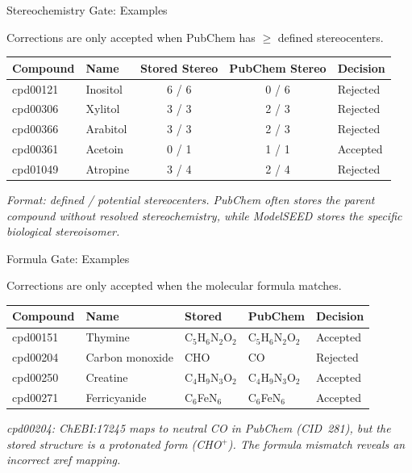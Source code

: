 \documentclass[aspectratio=169,11pt]{beamer}
\begin{document}
\begin{frame}{Stereochemistry Gate: Examples}

Corrections are only accepted when PubChem has $\geq$ defined stereocenters.

\bigskip
\begin{table}[h]
\centering
\footnotesize
\begin{tabular}{llccl}
\toprule
\textbf{Compound} & \textbf{Name}
  & \textbf{Stored Stereo} & \textbf{PubChem Stereo} & \textbf{Decision} \\
\midrule
cpd00121 & Inositol   & 6 / 6 & 0 / 6 & \textcolor{rejectred}{Rejected} \\
cpd00306 & Xylitol    & 3 / 3 & 2 / 3 & \textcolor{rejectred}{Rejected} \\
cpd00366 & Arabitol   & 3 / 3 & 2 / 3 & \textcolor{rejectred}{Rejected} \\
cpd00361 & Acetoin    & 0 / 1 & 1 / 1 & \textcolor{acceptgreen}{Accepted} \\
cpd01049 & Atropine   & 3 / 4 & 2 / 4 & \textcolor{rejectred}{Rejected} \\
\bottomrule
\end{tabular}
\end{table}

\bigskip
\footnotesize
\textit{Format: defined / potential stereocenters.
PubChem often stores the parent compound without resolved stereochemistry,
while ModelSEED stores the specific biological stereoisomer.}

\end{frame}

\begin{frame}[fragile]{Formula Gate: Examples}

Corrections are only accepted when the molecular formula matches.

\bigskip
\begin{table}[h]
\centering
\footnotesize
\begin{tabular}{lp{2cm}lll}
\toprule
\textbf{Compound} & \textbf{Name}
  & \textbf{Stored} & \textbf{PubChem} & \textbf{Decision} \\
\midrule
cpd00151 & Thymine
  & C$_5$H$_6$N$_2$O$_2$ & C$_5$H$_6$N$_2$O$_2$ & \textcolor{acceptgreen}{Accepted} \\
cpd00204 & Carbon monoxide
  & CHO & CO & \textcolor{rejectred}{Rejected} \\
cpd00250 & Creatine
  & C$_4$H$_9$N$_3$O$_2$ & C$_4$H$_9$N$_3$O$_2$ & \textcolor{acceptgreen}{Accepted} \\
cpd00271 & Ferricyanide
  & C$_6$FeN$_6$ & C$_6$FeN$_6$ & \textcolor{acceptgreen}{Accepted} \\
\bottomrule
\end{tabular}
\end{table}

\bigskip
\footnotesize
\textit{cpd00204: ChEBI:17245 maps to neutral CO in PubChem (CID~281), but
the stored structure is a protonated form (CHO$^+$). The formula mismatch
reveals an incorrect xref mapping.}

\end{frame}
\end{document}
